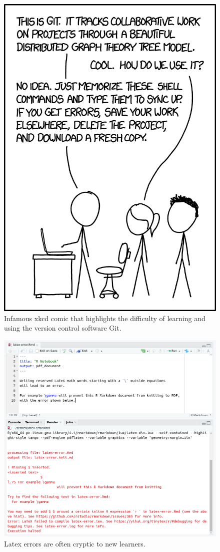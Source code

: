 \documentclass{article}
\begin{document}
\begin{figure}

{\centering \includegraphics[width=0.3\linewidth]{git_2x} 

}

\caption{Infamous xkcd comic that highlights the difficulty of learning and using the version control software Git.}\label{fig:git-is-hard-xkcd}
\end{figure}

\begin{figure}

{\centering \includegraphics[width=1\linewidth]{r-latex-error} 

}

\caption{Latex errors are often cryptic to new learners.}\label{fig:latex-errors}
\end{figure}
\end{document}
